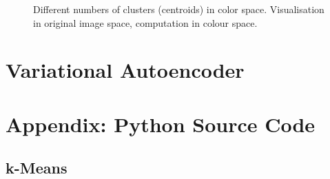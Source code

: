 \documentclass[11pt,a4paper,oneside]{article}
\begin{document}
\begin{figure}[ht]
   \centering
      \qquad
      \qquad
   \caption{Different numbers of clusters (centroids) in color space. Visualisation in original image space, computation in colour space.}
\end{figure}

\FloatBarrier

\section{Variational Autoencoder}


\newpage
\section{Appendix: Python Source Code}
\label{sec:app}

\subsection{k-Means}

\end{document}
